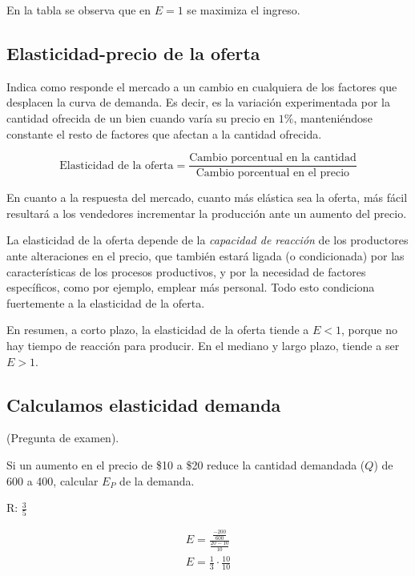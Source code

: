 En la tabla se observa que en \(E=1\) se maximiza el ingreso.

\subsection{Elasticidad-precio de la oferta}

Indica como responde el mercado a un cambio en cualquiera de los factores 
que desplacen la curva de demanda.
Es decir,
es la variación experimentada por la cantidad ofrecida de un bien 
cuando varía su precio en \(1\%\),
manteniéndose constante el resto de factores que afectan a la cantidad ofrecida.

\begin{equation*}
    \text{Elasticidad de la oferta} = \frac{\text{Cambio porcentual en la cantidad}}{\text{Cambio porcentual en el precio}}
\end{equation*}

En cuanto a la respuesta del mercado,
cuanto más elástica sea la oferta,
más fácil resultará a los vendedores incrementar la producción 
ante un aumento del precio.

La elasticidad de la oferta 
depende de la \textit{capacidad de reacción} de los productores
ante alteraciones en el precio,
que también estará ligada (o condicionada)
por las características de los procesos productivos,
y por la necesidad de factores específicos,
como por ejemplo, emplear más personal.
Todo esto condiciona fuertemente a la elasticidad de la oferta.

En resumen,
a corto plazo,
la elasticidad de la oferta tiende a \(E<1\),
porque no hay tiempo de reacción para producir.
En el mediano y largo plazo,
tiende a ser \(E>1\).

\subsection{Calculamos elasticidad demanda}

(Pregunta de examen).

Si un aumento en el precio de \$10 a \$20 reduce la cantidad demandada (\(Q\)) de 600 a 400,
calcular \(E_P\) de la demanda.

R: \(\frac{3}{5}\)

\begin{align*}
    E = \frac{\frac{-200}{600}}{\frac{20 - 10}{10}} \\
    E = \frac{1}{3} \cdot \frac{10}{10}
\end{align*}

